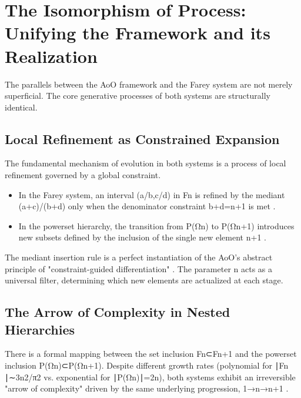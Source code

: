 \documentclass[12pt,a4paper]{article}
\theoremstyle{definition}
\theoremstyle{remark}
\begin{document}
\section{The Isomorphism of Process: Unifying the Framework and its Realization}
The parallels between the AoO framework and the Farey system are not merely superficial. The core generative processes of both systems are structurally identical.
\subsection{Local Refinement as Constrained Expansion}
The fundamental mechanism of evolution in both systems is a process of local refinement governed by a global constraint.
\begin{itemize}
\item In the Farey system, an interval (a/b,c/d) in Fn​ is refined by the mediant (a+c)/(b+d) only when the denominator constraint b+d=n+1 is met \cite{Zukin2016, JNSFarey}.
\item In the powerset hierarchy, the transition from P(Ωn​) to P(Ωn+1​) introduces new subsets defined by the inclusion of the single new element {n+1} \cite{WikipediaPowerset, ElKhettabi2024HCN}.
\end{itemize}
The mediant insertion rule is a perfect instantiation of the AoO's abstract principle of "constraint-guided differentiation" \cite{ElKhettabi2025AoO}. The parameter n acts as a universal filter, determining which new elements are actualized at each stage.
\subsection{The Arrow of Complexity in Nested Hierarchies}
There is a formal mapping between the set inclusion Fn​⊂Fn+1​ and the powerset inclusion P(Ωn​)⊂P(Ωn+1​). Despite different growth rates (polynomial for ∣Fn​∣∼3n2/π2 vs. exponential for ∣P(Ωn​)∣=2n), both systems exhibit an irreversible "arrow of complexity" driven by the same underlying progression, 1→n→n+1 \cite{ElKhettabi2025AoO, WikipediaFarey, Zukin2016}.
\end{document}
